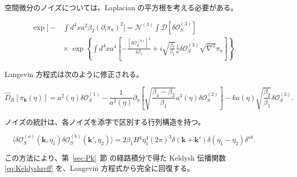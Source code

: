 \documentclass[a4paper,11pt]{ltjsarticle}
\numberwithin{equation}{section}
\def\pia{\pi_{a}}
\def\bfk{\textbf{k}}
\newcommand{\Os}{\delta \mathcal{O}_{S}}
\newcommand{\Sec}[1]{Sec.~\ref{#1}}
\renewcommand{\Sec}[1]{第~\ref{#1}~節}
\begin{document}
空間微分のノイズについては、Laplacian の平方根を考える必要がある。

\begin{align}
\exp\Bigg[-&\int d^{4}x a^{2}\beta_{2}(\partial_{i}\pia)^{2}\Bigg]=\mathcal{N}^{(3)}\int\mathcal{D}[\Os^{(3)}]\\
&\times\;\exp\left\{\int d^{4}x a^{4}\left[-\frac{[\Os^{(3)}]^{2}}{4\beta_{1}}+i\sqrt{\frac{\beta_{2}}{\beta_{1}}}\frac{1}{a}\Os^{(3)}\sqrt{\nabla^{2}}\pia\right]\right\}.\nonumber
\end{align}

Langevin 方程式は次のように修正される。

\begin{equation}
\widehat{D}_{R}[\pi_{\bfk}(\eta)]=a^{2}(\eta)\Os^{(1)}-\frac{1}{a^{2}(\eta)}\partial_{\eta}\left[\sqrt{\frac{\beta_{4}-\beta_{2}}{\beta_{1}}}a^{3}(\eta)\Os^{(2)}\right]-ka(\eta)\sqrt{\frac{\beta_{2}}{\beta_{1}}}\Os^{(3)}.
\end{equation}

ノイズの統計は、各ノイズを添字で区別する行列構造を持つ。

\begin{equation}
\langle\delta\mathcal{O}^{(a)}_{S}(\bfk, \eta_{1})\delta\mathcal{O}^{(b)}_{S}(\bfk', \eta_{2})\rangle=2\beta_{1}H^{4}\eta_{1}^{4}(2\pi)^{3}\delta(\bfk+\bfk')\delta(\eta_{1}-\eta_{2})\delta^{ab}.
\end{equation}

この方法により、\Sec{sec:Pk} の経路積分で得た Keldysh 伝播関数 \eqref{eq:Keldyshreff} を、Langevin 方程式から完全に回復する。
\end{document}
